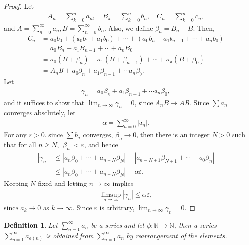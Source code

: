 \documentclass[10pt]{book}
\newtheorem{definition}{Definition}[chapter]
\theoremstyle{definition}
\numberwithin{equation}{chapter}
\begin{document}
\begin{proof}
Let
\begin{align*}
    A_n = \sum^n_{k=0} a_n, \quad B_n = \sum^n_{k=0} b_n, \quad C_n = \sum^n_{k=0} c_n, 
\end{align*}
and $A = \sum^\infty_{n=0} a_n, B = \sum^\infty_{n=0} b_n$. Also, we define $\beta_n = B_n - B$. Then,
\begin{align*}
    C_n & = a_0b_0 + (a_0b_1 + a_1b_0) + \cdots + (a_0b_n + a_1b_{n-1} + \cdots + a_nb_0) \\
    & = a_0 B_n + a_1 B_{n-1} + \cdots + a_n B_0 \\
    & = a_0 (B + \beta_n) + a_1 (B + \beta_{n-1}) + \cdots + a_n (B + \beta_0) \\
    & = A_n B + a_0 \beta_n + a_1 \beta_{n-1} + \cdots a_n \beta_0.
\end{align*}
Let
\begin{align*}
    \gamma_n = a_0 \beta_n + a_1 \beta_{n-1} + \cdots a_n \beta_0,
\end{align*}
and it suffices to show that $\lim_{n\to\infty} \gamma_n = 0$, since $A_nB \to AB$. Since $\sum a_n$ converges absolutely, let
\begin{align*}
    \alpha = \sum^\infty_{n=0} \left|a_n\right|.
\end{align*}
For any $\varepsilon > 0$, since $\sum b_n$ converges, $\beta_n \to 0$, then there is an integer $N > 0$ such that for all $n \geq N$, $\left|\beta_n\right| < \varepsilon$, and hence
\begin{align*}
    \left|\gamma_n\right| & \leq \left|a_n \beta_0 + \cdots + a_{n-N} \beta_N\right| + \left|a_{n-N+1} \beta_{N+1} + \cdots + a_0 \beta_n\right| \\
    & \leq \left|a_n \beta_0 + \cdots + a_{n-N} \beta_N\right| + \alpha \varepsilon.
\end{align*}
Keeping $N$ fixed and letting $n \to \infty$ implies
\begin{align*}
    \limsup_{n\to\infty} \left|\gamma_n\right| \leq \alpha \varepsilon,
\end{align*}
since $a_k \to 0$ as $k \to \infty$. Since $\varepsilon$ is arbitrary, $\lim_{n\to\infty} \gamma_n = 0$.
\end{proof}

\medskip

\begin{definition}
Let $\sum^\infty_{n=1} a_n$ be a series and let $\phi: \mathbb{N} \to \mathbb{N}$, then a series $\sum^\infty_{n=1} a_{\phi(n)}$ is obtained from $\sum^\infty_{n=1} a_n$ by rearrangement of the elements. 
\end{definition}
\end{document}
